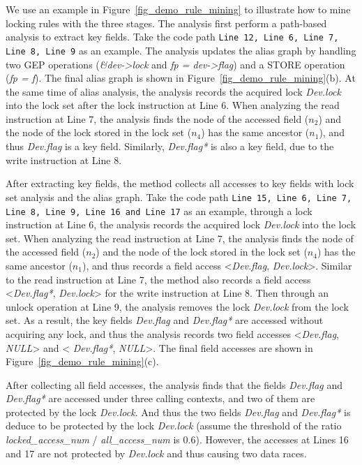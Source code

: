  We use an example in 
Figure~\ref{fig_demo_rule_mining} to illustrate how to mine locking rules 
with the three stages. The analysis first perform a path-based analysis to 
extract key fields. Take the code path {\tt Line 12, Line 6, Line 7, Line 8, 
Line 9} as an example. The analysis updates the alias graph by handling two GEP 
operations ({\em \&dev->lock} and {\em fp = dev->flag}) and a STORE operation 
({\em *fp = f}). The final alias graph is shown in 
Figure~\ref{fig_demo_rule_mining}(b). At the same time of alias analysis, the 
analysis records the acquired lock {\em Dev.lock} into the lock set after the 
lock instruction at Line 6. When analyzing the read instruction at Line 7, the 
analysis finds the node of the accessed field ($\mathit{n_2}$) and the node of 
the lock stored in the lock set ($\mathit{n_4}$) has the same ancestor 
($\mathit{n_1}$), and thus {\em Dev.flag} is a key field. Similarly, {\em 
Dev.flag*} is also a key field, due to the write instruction at Line 8. 

After extracting key fields, the method collects all accesses to key fields 
with lock set analysis and the alias graph. Take the code path {\tt Line 15, 
Line 6, Line 7, Line 8, Line 9, Line 16 and Line 17} as an example, through a 
lock instruction at Line 6, the analysis records the acquired lock {\em 
Dev.lock} into the lock set. When analyzing the read instruction at Line 7, the 
analysis finds the node of the accessed field ($\mathit{n_2}$) and the node of 
the lock stored in the lock set ($\mathit{n_4}$) has the same ancestor 
($\mathit{n_1}$), and thus records a field access <{\em Dev.flag}, {\em 
Dev.lock}>. Similar to the read instruction at Line 7, the method also records 
a field access <{\em Dev.flag*}, {\em Dev.lock}> for the write instruction at 
Line 8. Then through an unlock operation at Line 9, the analysis removes the 
lock {\em Dev.lock} from the lock set. As a result, the key fields {\em 
Dev.flag} and {\em Dev.flag*} are accessed without acquiring any lock, and thus 
the analysis records two field accesses <{\em Dev.flag}, {\em NULL}> and <{\em 
Dev.flag*}, {\em NULL}>. The final field accesses are shown in 
Figure~\ref{fig_demo_rule_mining}(c).

After collecting all field accesses, the analysis finds that the fields {\em 
Dev.flag} and {\em Dev.flag*} are accessed under three calling contexts, and 
two of them are protected by the lock {\em Dev.lock}. And thus the two fields 
{\em Dev.flag} and {\em Dev.flag*} is deduce to be protected by the lock {\em 
Dev.lock} (assume the threshold of the ratio {\em locked\_access\_num} / 
{\em all\_access\_num} is 0.6). However, the accesses at Lines 16 and 17 are 
not protected by {\em Dev.lock} and thus causing two data races.

